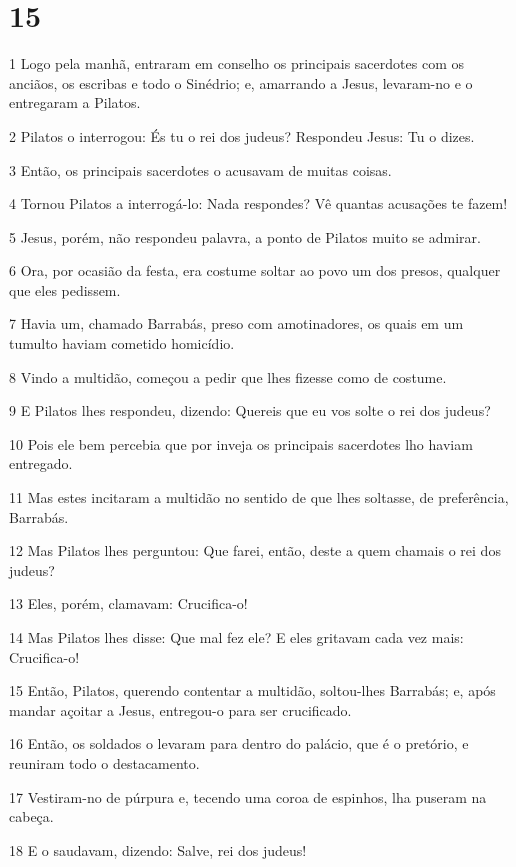 \chapter{15}

\par 1 Logo pela manhã, entraram em conselho os principais sacerdotes com os anciãos, os escribas e todo o Sinédrio; e, amarrando a Jesus, levaram-no e o entregaram a Pilatos.
\par 2 Pilatos o interrogou: És tu o rei dos judeus? Respondeu Jesus: Tu o dizes.
\par 3 Então, os principais sacerdotes o acusavam de muitas coisas.
\par 4 Tornou Pilatos a interrogá-lo: Nada respondes? Vê quantas acusações te fazem!
\par 5 Jesus, porém, não respondeu palavra, a ponto de Pilatos muito se admirar.
\par 6 Ora, por ocasião da festa, era costume soltar ao povo um dos presos, qualquer que eles pedissem.
\par 7 Havia um, chamado Barrabás, preso com amotinadores, os quais em um tumulto haviam cometido homicídio.
\par 8 Vindo a multidão, começou a pedir que lhes fizesse como de costume.
\par 9 E Pilatos lhes respondeu, dizendo: Quereis que eu vos solte o rei dos judeus?
\par 10 Pois ele bem percebia que por inveja os principais sacerdotes lho haviam entregado.
\par 11 Mas estes incitaram a multidão no sentido de que lhes soltasse, de preferência, Barrabás.
\par 12 Mas Pilatos lhes perguntou: Que farei, então, deste a quem chamais o rei dos judeus?
\par 13 Eles, porém, clamavam: Crucifica-o!
\par 14 Mas Pilatos lhes disse: Que mal fez ele? E eles gritavam cada vez mais: Crucifica-o!
\par 15 Então, Pilatos, querendo contentar a multidão, soltou-lhes Barrabás; e, após mandar açoitar a Jesus, entregou-o para ser crucificado.
\par 16 Então, os soldados o levaram para dentro do palácio, que é o pretório, e reuniram todo o destacamento.
\par 17 Vestiram-no de púrpura e, tecendo uma coroa de espinhos, lha puseram na cabeça.
\par 18 E o saudavam, dizendo: Salve, rei dos judeus!
